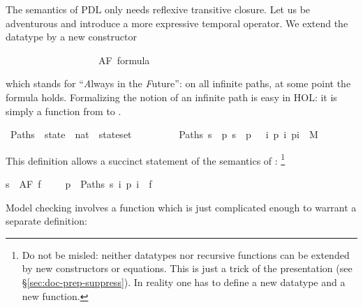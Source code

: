 %
\begin{isabellebody}%
\def\isabellecontext{CTL}%
\isamarkupfalse%
%
\isamarkuptrue%
%
\begin{isamarkuptext}%
\label{sec:CTL}
%
The semantics of PDL only needs reflexive transitive closure.
Let us be adventurous and introduce a more expressive temporal operator.
We extend the datatype
 by a new constructor%
\end{isamarkuptext}%
\isamarkuptrue%
\ \ \ \ \ \ \ \ \ \ \ \ \ \ \ \ \ \ {\isacharbar}\ AF\ formula\isamarkupfalse%
%
\begin{isamarkuptext}%
\noindent
which stands for ``\emph{A}lways in the \emph{F}uture'':
on all infinite paths, at some point the formula holds.
Formalizing the notion of an infinite path is easy
in HOL: it is simply a function from  to .%
\end{isamarkuptext}%
\isamarkuptrue%
\ Paths\ {\isacharcolon}{\isacharcolon}\ {\isachardoublequote}state\ {\isasymRightarrow}\ {\isacharparenleft}nat\ {\isasymRightarrow}\ state{\isacharparenright}set{\isachardoublequote}\isanewline
\ \ \ \ \ \ \ \ \ {\isachardoublequote}Paths\ s\ {\isasymequiv}\ {\isacharbraceleft}p{\isachardot}\ s\ {\isacharequal}\ p\ {}\ {\isasymand}\ {\isacharparenleft}{\isasymforall}i{\isachardot}\ {\isacharparenleft}p\ i{\isacharcomma}\ p{\isacharparenleft}i{\isacharplus}{}{\isacharparenright}{\isacharparenright}\ {\isasymin}\ M{\isacharparenright}{\isacharbraceright}{\isachardoublequote}\isamarkupfalse%
%
\begin{isamarkuptext}%
\noindent
This definition allows a succinct statement of the semantics of :
\footnote{Do not be misled: neither datatypes nor recursive functions can be
extended by new constructors or equations. This is just a trick of the
presentation (see \S\ref{sec:doc-prep-suppress}). In reality one has to define
a new datatype and a new function.}%
\end{isamarkuptext}%
\isamarkuptrue%
\isamarkupfalse%
{\isachardoublequote}s\ {\isasymTurnstile}\ AF\ f\ \ \ \ {\isacharequal}\ {\isacharparenleft}{\isasymforall}p\ {\isasymin}\ Paths\ s{\isachardot}\ {\isasymexists}i{\isachardot}\ p\ i\ {\isasymTurnstile}\ f{\isacharparenright}{\isachardoublequote}\isamarkupfalse%
%
\begin{isamarkuptext}%
\noindent
Model checking  involves a function which
is just complicated enough to warrant a separate definition:%

\end{isamarkuptext}
\end{isabellebody}
